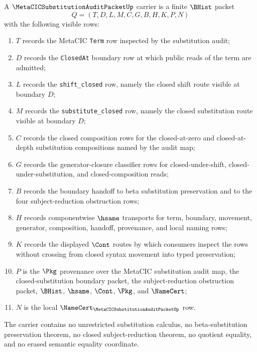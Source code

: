 \begin{definition}
\label{def:metacic-substitution-audit-packet-carrier}
A $\MetaCICSubstitutionAuditPacketUp$ carrier is a finite $\BHist$ packet
$$
Q=(T,D,L,M,C,G,B,H,K,P,N)
$$
with the following visible rows:
\begin{enumerate}
\item $T$ records the MetaCIC \texttt{Term} row inspected by the substitution audit;
\item $D$ records the \texttt{ClosedAt} boundary row at which public reads of the term are admitted;
\item $L$ records the \texttt{shift\_closed} row, namely the closed shift route visible at boundary $D$;
\item $M$ records the \texttt{substitute\_closed} row, namely the closed substitution route visible at boundary $D$;
\item $C$ records the closed composition rows for the closed-at-zero and closed-at-depth substitution compositions named by the audit map;
\item $G$ records the generator-closure classifier rows for closed-under-shift, closed-under-substitution, and closed-composition reads;
\item $B$ records the boundary handoff to beta substitution preservation and to the four subject-reduction obstruction rows;
\item $H$ records componentwise $\hsame$ transports for term, boundary, movement, generator, composition, handoff, provenance, and local naming rows;
\item $K$ records the displayed $\Cont$ routes by which consumers inspect the rows without crossing from closed syntax movement into typed preservation;
\item $P$ is the $\Pkg$ provenance over the MetaCIC substitution audit map, the closed-substitution boundary packet, the subject-reduction obstruction packet, $\BHist$, $\hsame$, $\Cont$, $\Pkg$, and $\NameCert$;
\item $N$ is the local $\NameCert_{\MetaCICSubstitutionAuditPacketUp}$ row.
\end{enumerate}
The carrier contains no unrestricted substitution calculus, no beta-substitution preservation theorem, no closed subject-reduction theorem, no quotient equality, and no erased semantic equality coordinate.
\end{definition}

